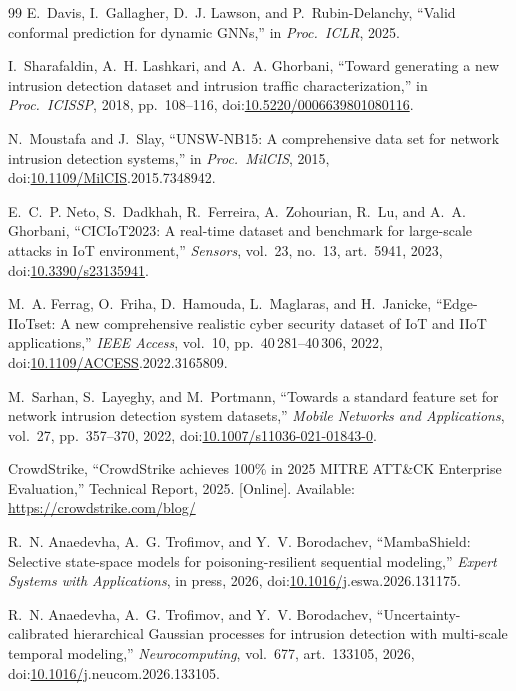 \documentclass{ieeeaccess}
\begin{document}
\begin{thebibliography}{99}
E.~Davis, I.~Gallagher, D.~J. Lawson, and P.~Rubin-Delanchy,
``Valid conformal prediction for dynamic GNNs,''
in \emph{Proc.\ ICLR}, 2025.

I.~Sharafaldin, A.~H. Lashkari, and A.~A. Ghorbani,
``Toward generating a new intrusion detection dataset and intrusion traffic
characterization,''
in \emph{Proc.\ ICISSP}, 2018, pp.~108--116,
doi:\href{https://doi.org/10.5220/0006639801080116}{10.5220/0006639801080116}.

N.~Moustafa and J.~Slay,
``UNSW-NB15: A comprehensive data set for network intrusion detection
systems,''
in \emph{Proc.\ MilCIS}, 2015, doi:\href{https://doi.org/10.1109/MilCIS}{10.1109/MilCIS}.2015.7348942.

E.~C.~P. Neto, S.~Dadkhah, R.~Ferreira, A.~Zohourian, R.~Lu, and
A.~A. Ghorbani,
``CICIoT2023: A real-time dataset and benchmark for large-scale attacks in
IoT environment,''
\emph{Sensors}, vol.~23, no.~13, art.~5941, 2023, doi:\href{https://doi.org/10.3390/s23135941}{10.3390/s23135941}.

M.~A. Ferrag, O.~Friha, D.~Hamouda, L.~Maglaras, and H.~Janicke,
``Edge-IIoTset: A new comprehensive realistic cyber security dataset of IoT
and IIoT applications,''
\emph{IEEE Access}, vol.~10, pp.~40\,281--40\,306, 2022,
doi:\href{https://doi.org/10.1109/ACCESS}{10.1109/ACCESS}.2022.3165809.

M.~Sarhan, S.~Layeghy, and M.~Portmann,
``Towards a standard feature set for network intrusion detection system
datasets,''
\emph{Mobile Networks and Applications}, vol.~27, pp.~357--370, 2022,
doi:\href{https://doi.org/10.1007/s11036-021-01843-0}{10.1007/s11036-021-01843-0}.

CrowdStrike,
``CrowdStrike achieves 100\% in 2025 MITRE ATT\&CK Enterprise Evaluation,''
Technical Report, 2025. [Online]. Available:
\url{https://crowdstrike.com/blog/}


R.~N. Anaedevha, A.~G. Trofimov, and Y.~V. Borodachev,
``MambaShield: Selective state-space models for poisoning-resilient
sequential modeling,''
\emph{Expert Systems with Applications}, in press, 2026,
doi:\href{https://doi.org/10.1016/j}{10.1016/j}.eswa.2026.131175.

R.~N. Anaedevha, A.~G. Trofimov, and Y.~V. Borodachev,
``Uncertainty-calibrated hierarchical Gaussian processes for intrusion
detection with multi-scale temporal modeling,''
\emph{Neurocomputing}, vol.~677, art.~133105, 2026,
doi:\href{https://doi.org/10.1016/j}{10.1016/j}.neucom.2026.133105.


\end{thebibliography}
\end{document}
